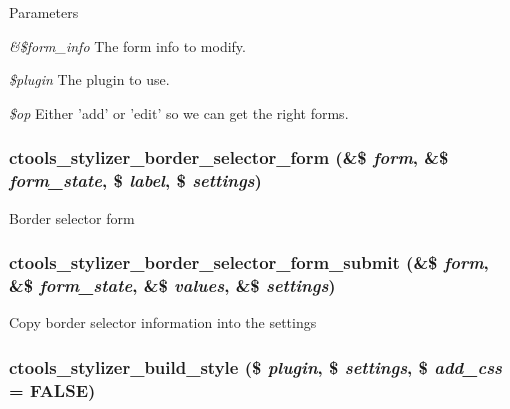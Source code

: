 \begin{DoxyParams}{Parameters}
\item[{\em \&\$form\_\-info}]The form info to modify. \item[{\em \$plugin}]The plugin to use. \item[{\em \$op}]Either 'add' or 'edit' so we can get the right forms. \end{DoxyParams}
\hypertarget{includes_2stylizer_8inc_a4e108b363a7b52c178f472b6927a0681}{
\subsubsection[{ctools\_\-stylizer\_\-border\_\-selector\_\-form}]{\setlength{\rightskip}{0pt plus 5cm}ctools\_\-stylizer\_\-border\_\-selector\_\-form (\&\$ {\em form}, \/  \&\$ {\em form\_\-state}, \/  \$ {\em label}, \/  \$ {\em settings})}}
\label{includes_2stylizer_8inc_a4e108b363a7b52c178f472b6927a0681}
Border selector form \hypertarget{includes_2stylizer_8inc_a7443b42b0b3b1e2fdebe47649d2256d6}{
\subsubsection[{ctools\_\-stylizer\_\-border\_\-selector\_\-form\_\-submit}]{\setlength{\rightskip}{0pt plus 5cm}ctools\_\-stylizer\_\-border\_\-selector\_\-form\_\-submit (\&\$ {\em form}, \/  \&\$ {\em form\_\-state}, \/  \&\$ {\em values}, \/  \&\$ {\em settings})}}
\label{includes_2stylizer_8inc_a7443b42b0b3b1e2fdebe47649d2256d6}
Copy border selector information into the settings \hypertarget{includes_2stylizer_8inc_a9bb576123a71e881578bece05f98bbcf}{
\subsubsection[{ctools\_\-stylizer\_\-build\_\-style}]{\setlength{\rightskip}{0pt plus 5cm}ctools\_\-stylizer\_\-build\_\-style (\$ {\em plugin}, \/  \$ {\em settings}, \/  \$ {\em add\_\-css} = {\ttfamily FALSE})}}
